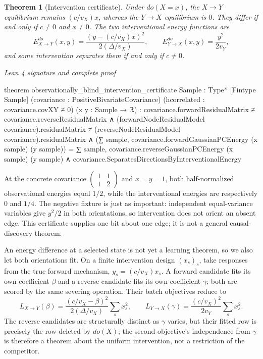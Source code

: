 \documentclass[11pt]{article}
\newtheorem{theorem}{Theorem}[section]
\newcommand{\leancommit}{f3a31db36bb2f944312ee31c1d86c2758109e83a}
\newcommand{\leansignaturelink}[2]{%
  \par\Needspace{0.3\textheight}\smallskip\noindent
  \href{https://github.com/zariuq/MeTTapedia/blob/\leancommit/#1\#L#2}{%
    \scriptsize\itshape Lean 4 signature and complete proof}\par\nobreak}
\begin{document}
\begin{theorem}[Intervention certificate]\label{thm:intervention}
Under $do(X=x)$, the $X\to Y$ equilibrium remains $(c/v_X)x$, whereas the $Y\to X$
equilibrium is $0$.  They differ if and only if $c\ne0$ and $x\ne0$.  The two
interventional energy functions are
\[
E^{do}_{X\to Y}(x,y)=\frac{(y-(c/v_X)x)^2}{2(\Delta/v_X)},
\qquad
E^{do}_{Y\to X}(x,y)=\frac{y^2}{2v_Y},
\]
and some intervention separates them if and only if $c\ne0$.
\end{theorem}

\leansignaturelink{lean/mettapedia/Mettapedia/MachineLearning/NeuralNetworks/%
PredictiveCoding/CausalDirectionIdentifiability.lean}{866}
\begin{leansignature}
theorem observationally_blind_intervention_certificate
    {Sample : Type*} [Fintype Sample]
    (covariance : PositiveBivariateCovariance)
    (hcorrelated : covariance.covXY ≠ 0) (x y : Sample → ℝ) :
    covariance.forwardResidualMatrix ≠ covariance.reverseResidualMatrix ∧
      (forwardNodeResidualModel covariance).residualMatrix ≠
        (reverseNodeResidualModel covariance).residualMatrix ∧
      (∑ sample, covariance.forwardGaussianPCEnergy (x sample) (y sample)) =
        ∑ sample, covariance.reverseGaussianPCEnergy (x sample) (y sample) ∧
      covariance.SeparatesDirectionsByInterventionalEnergy
\end{leansignature}

At the concrete covariance $\left(\begin{smallmatrix}1&1\\1&2\end{smallmatrix}\right)$
and $x=y=1$, both half-normalized observational energies equal $1/2$, while the
interventional energies are respectively $0$ and $1/4$.  The negative fixture is just
as important: independent equal-variance variables give $y^2/2$ in both orientations,
so intervention does not orient an absent edge.  This certificate supplies one bit about
one edge; it is not a general causal-discovery theorem.

An energy difference at a selected state is not yet a learning theorem, so we also let
both orientations fit.  On a finite intervention design $(x_s)_s$, take responses from
the true forward mechanism, $y_s=(c/v_X)x_s$.  A forward candidate fits its own
coefficient $\beta$ and a reverse candidate fits its own coefficient $\gamma$; both are
scored by the same severing operation.  Their batch objectives reduce to
\[
L_{X\to Y}(\beta)
 = \frac{(c/v_X-\beta)^2}{2(\Delta/v_X)}\sum_s x_s^2,
\qquad
L_{Y\to X}(\gamma)
 = \frac{(c/v_X)^2}{2v_Y}\sum_s x_s^2.
\]
The reverse candidates are structurally distinct as $\gamma$ varies, but their fitted
row is precisely the row deleted by $do(X)$; the second objective's independence from
$\gamma$ is therefore a theorem about the uniform intervention, not a restriction of
the competitor.
\end{document}
